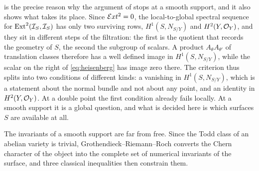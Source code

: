 \begin{remark}\label{rem:obstructionmoves}
 is the precise reason why the argument of
 stops at a smooth support, and it also shows what
takes its place. Since $\mathcal{E} xt^{2}=0$, the local-to-global spectral sequence
for $\operatorname{Ext}^{2}(\mathcal{I}_{S},\mathcal{I}_{S})$ has only two surviving rows,
$H^{1}(S,N_{S/Y})$ and $H^{2}(Y,\mathcal{O}_{Y})$, and they sit in different steps of
the filtration: the first is the quotient that records the geometry of $S$,
the second the subgroup of scalars. A product $A_{\theta}A_{\theta'}$ of
translation classes therefore has a well defined image in $H^{1}(S,N_{S/Y})$,
while the scalar on the right of \eqref{eq:heisenberg} has image zero there.
The criterion thus splits into two conditions of different kinds: a vanishing
in $H^{1}(S,N_{S/Y})$, which is a statement about the normal bundle and not
about any point, and an identity in $H^{2}(Y,\mathcal{O}_{Y})$. At a double point the
first condition already fails locally. At a smooth support it is a global
question, and what is decided here is which surfaces $S$ are available at
all.
\end{remark}

The invariants of a smooth support are far from free. Since the Todd class of
an abelian variety is trivial, Grothendieck--Riemann--Roch converts the Chern
character of the object into the complete set of numerical invariants of the
surface, and three classical inequalities then constrain them.

